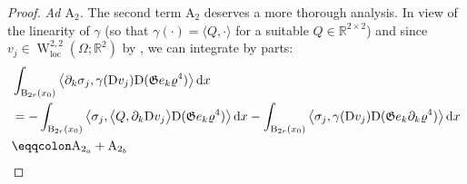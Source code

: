 \documentclass[a4paper,10pt,reqno,oneside]{amsart}
\numberwithin{equation}{section}
\newcommand{\R}{\mathbb R}
\newcommand{\ball}{\mathrm{B}}
\newcommand{\sobo}{\operatorname{W}}
\newcommand{\loc}{\mathrm{loc}}
\newcommand{\D}{\mathrm{D}}
\newcommand{\dx}[1]{\,\mathrm{d}#1}
\newcommand{\del}{\partial}
\newcommand{\skalarProd}[2]{\big\langle#1,#2\big\rangle}
\begin{document}
\begin{proof}
\emph{Ad $\mathrm{A}_2$.} The second term $\mathrm{A}_2$ deserves a more thorough analysis. In view of the linearity of $\gamma$ (so that $\gamma(\cdot)=\skalarProd{Q}{\cdot}$ for a suitable $Q\in\R^{2\times2}$) and since $v_j\in \sobo^{2,2}_{\loc}(\Omega;\R^2)$ by , we can integrate by parts:
\begin{align}
 &\int_{\ball_{2r}(x_0)} \skalarProd{\del_k \sigma_j}{\gamma(\D v_j) \D(\mathfrak{G}e_k \varrho^4)}\dx{x}\notag \\ 
 &= -\int_{\ball_{2r}(x_0)}\skalarProd{\sigma_j}{\skalarProd{Q}{\partial_k\D v_j}\D(\mathfrak{G}e_k \varrho^4)}\dx{x}
 -\int_{\ball_{2r}(x_0)}\skalarProd{\sigma_j}{\gamma(\D v_j)\D(\mathfrak{G}e_k \partial_k\varrho^4)} \dx{x}\\
 & \eqqcolon \mathrm{A}_{2_{a}} + \mathrm{A}_{2_{b}} \notag
\end{align}


\end{proof}
\end{document}
